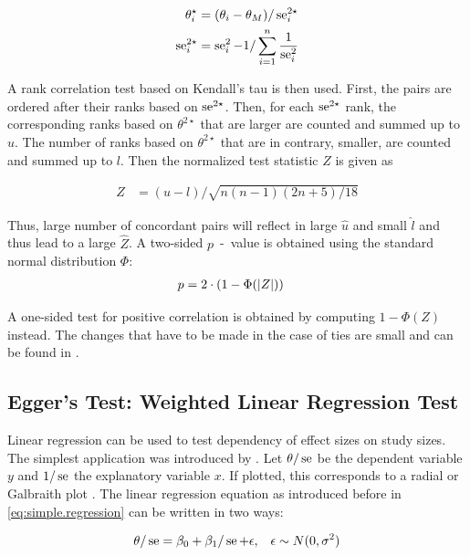 \documentclass[11pt,a4paper,twoside]{book}\usepackage[]{graphicx}\usepackage[]{color}
\begin{document}
\begin{align}
\theta_i^\star &= (\theta_i - \theta_M)/\operatorname{se}_i^{2\star} \label{eq:begg.stand.eff}  \\
\operatorname{se}_i^{2\star} &= \operatorname{se}_i^2 - 1/\sum_{i = 1}^n\frac{1}{\operatorname{se}_i^2} \label{eq:begg.stand.var} 
\end{align}

A rank correlation test based on Kendall's tau is then used. First, the pairs are ordered after their ranks based on $\operatorname{se}^{2\star}$. Then, for each $\operatorname{se}^{2\star}$ rank, the corresponding ranks based on $\theta^{2\star}$ that are larger are counted and summed up to $u$. The number of ranks based on $\theta^{2\star}$ that are in contrary, smaller, are counted and summed up to $l$. Then the normalized test statistic $Z$ is given as

\begin{align}
Z &= (u - l)/\sqrt{n(n-1)(2n + 5)/18} \nonumber
\end{align}

Thus, large number of concordant pairs will reflect in large $\hat{u}$ and small $\hat{l}$ and thus lead to a large $\hat{Z}$. A two-sided  $p$\hspace{0.4mm}~-~value is obtained using the standard normal distribution $\Phi$:
\begin{align}
p &= 2\cdot(1-\Phi(\left\lvert Z\right\rvert)) \nonumber
\end{align}

A one-sided test for positive correlation is obtained by computing $1-\Phi(Z)$ instead.
The changes that have to be made in the case of ties are small and can be found in \cite[p. 410]{begg.ties}.


\subsection{Egger's Test: Weighted Linear Regression Test} \label{sec:Egger}
Linear regression can be used to test dependency of effect sizes on study sizes. The simplest application was introduced by \citet{Egger}.
Let $\theta/\operatorname{se}$ be the dependent variable $y$ and $1/\operatorname{se}$ the explanatory variable $x$. If plotted, this corresponds to a radial or Galbraith plot \citep{galbraith}. The linear regression equation as introduced before in \eqref{eq:simple.regression} can be written in two ways:

\begin{align}
\theta/\operatorname{se} &= \beta_0 + \beta_1/\operatorname{se} + \epsilon, & \epsilon \sim N(0, \sigma^2) \label{eq:radial.plot} 
\end{align}
\end{document}
